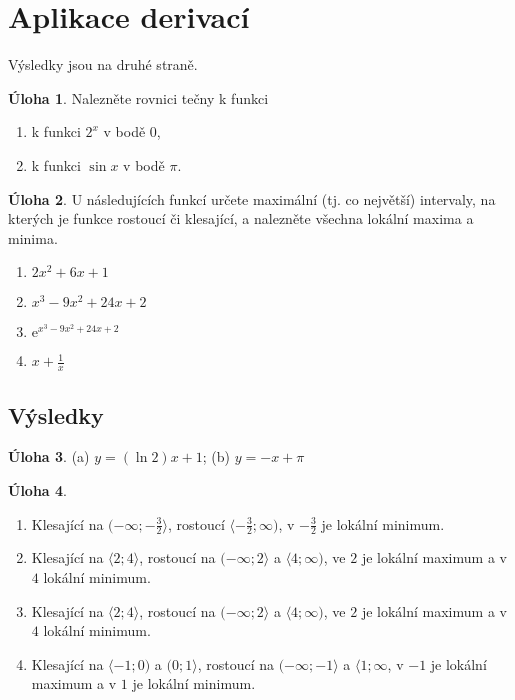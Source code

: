 \documentclass[12pt,a4paper]{article}
\theoremstyle{definition}
\newtheorem{uloha}{Úloha}
\def\ee{\mathrm{e}}
\begin{document}
\section*{Aplikace derivací}

Výsledky jsou na druhé straně.

\begin{uloha}
Nalezněte rovnici tečny k funkci
\begin{enumerate}
	\item k funkci $2^x$ v bodě $0$,
	\item k funkci $\sin x$ v bodě $\pi$.
\end{enumerate}
\end{uloha}


\begin{uloha}
U následujících funkcí určete maximální (tj. co největší) intervaly, na kterých je funkce rostoucí či klesající, a nalezněte všechna lokální maxima a minima.
\begin{enumerate}
	\item $2x^2 + 6x + 1$
	\item $x^3-9 x^2+24 x+2$
	\item $\ee^{x^3-9 x^2+24 x+2}$
	\item $x + \frac1x$
\end{enumerate}
\end{uloha}

\newpage

\subsection*{Výsledky}

\setcounter{uloha}{0}

\begin{uloha}
(a) $y = (\ln 2) x + 1$; (b) $y = -x + \pi$
\end{uloha}


\begin{uloha}
\begin{enumerate}
	\item Klesající na $(-\infty; -\frac32\rangle$, rostoucí $\langle-\frac32; \infty)$, v $-\frac32$ je lokální minimum.
	\item Klesající na $\langle2; 4\rangle$, rostoucí na $(-\infty; 2\rangle$ a $\langle4; \infty)$, ve $2$ je lokální maximum a v $4$ lokální minimum.
	\item Klesající na $\langle2; 4\rangle$, rostoucí na $(-\infty; 2\rangle$ a $\langle4; \infty)$, ve $2$ je lokální maximum a v $4$ lokální minimum.
	\item Klesající na $\langle-1; 0)$ a $(0; 1\rangle$, rostoucí na $(-\infty; -1\rangle$ a $\langle1; \infty$, v $-1$ je lokální maximum a v $1$ je lokální minimum.
\end{enumerate}
\end{uloha}
\end{document}
